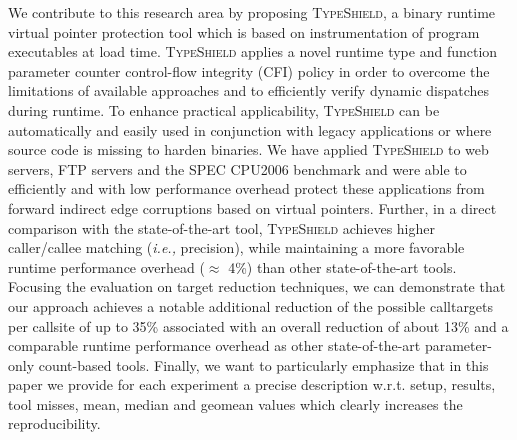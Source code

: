 We contribute to this research area by proposing \textsc{TypeShield}, a binary runtime virtual pointer protection tool 
which is based on instrumentation of program executables at load time. \textsc{TypeShield} applies a novel runtime 
type and function parameter counter control-flow integrity (CFI) policy in order to overcome the limitations of available approaches and to 
efficiently verify dynamic dispatches during runtime. To enhance practical applicability, \textsc{TypeShield} can 
be automatically and easily used in conjunction with legacy applications or where source code is missing to harden 
binaries.
We have applied \textsc{TypeShield} to web servers, FTP servers and the SPEC CPU2006 benchmark and were able to 
efficiently and with low performance overhead protect these applications from forward indirect edge corruptions 
based on virtual pointers. Further, in a direct comparison with the state-of-the-art tool, \textsc{TypeShield} 
achieves higher caller/callee matching (\textit{i.e.,} precision), while maintaining a more favorable 
runtime performance overhead ($\approx$ 4\%) than other state-of-the-art tools.
Focusing the evaluation on target reduction techniques, we can demonstrate that our approach achieves a notable 
additional reduction of the possible calltargets per callsite of up to 35\% associated with an overall reduction
of about 13\% and a comparable runtime performance overhead as other state-of-the-art parameter-only count-based tools.
Finally, we want to particularly emphasize that in this paper we provide for each experiment a precise description
w.r.t. setup, results, tool misses, mean, median and geomean values which clearly increases the reproducibility.